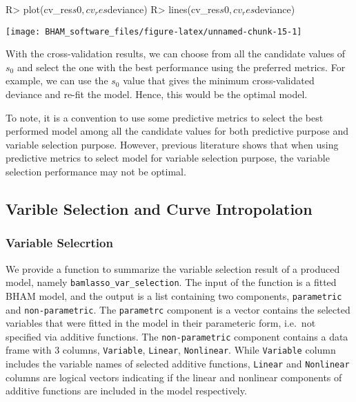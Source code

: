 \documentclass[
]{jss}
\begin{document}
\begin{CodeChunk}
\begin{CodeInput}
R> plot(cv_res$s0, cv_res$deviance)
R> lines(cv_res$s0, cv_res$deviance)
\end{CodeInput}


\begin{center}\texttt{[image: BHAM\_software\_files/figure-latex/unnamed-chunk-15-1]} \end{center}

\end{CodeChunk}

With the cross-validation results, we can choose from all the candidate
values of \(s_0\) and select the one with the best performance using the
preferred metrics. For example, we can use the \(s_0\) value that gives
the minimum cross-validated deviance and re-fit the model. Hence, this
would be the optimal model.

\begin{CodeChunk}
\end{CodeChunk}

To note, it is a convention to use some predictive metrics to select the
best performed model among all the candidate values for both predictive
purpose and variable selection purpose. However, previous literature
\citep{Wu2019} shows that when using predictive metrics to select model
for variable selection purpose, the variable selection performance may
not be optimal.

\subsection{Varible Selection and Curve Intropolation}
\subsubsection{Variable Selecrtion}

We provide a function to summarize the variable selection result of a
produced model, namely \texttt{bamlasso\_var\_selection}. The input of
the function is a fitted BHAM model, and the output is a list containing
two components, \texttt{parametric} and \texttt{non-parametric}. The
\texttt{parametrc} component is a vector contains the selected variables
that were fitted in the model in their parameteric form, i.e.~not
specified via additive functions. The \texttt{non-parametric} component
contains a data frame with 3 columns, \texttt{Variable},
\texttt{Linear}, \texttt{Nonlinear}. While \texttt{Variable} column
includes the variable names of selected additive functions,
\texttt{Linear} and \texttt{Nonlinear} columns are logical vectors
indicating if the linear and nonlinear components of additive functions
are included in the model respectively.
\end{document}
